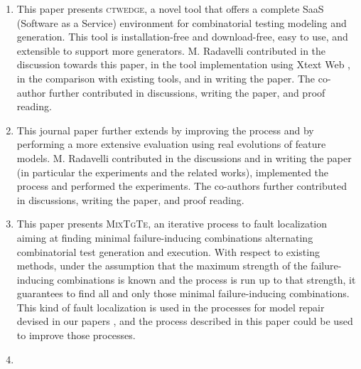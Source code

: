 \documentclass [a4paper, 12pt, twoside]{report}
\newcommand{\ctwedge}{\textsc{ctwedge}\xspace}
\newcommand{\mix}{\textsc{MixTgTe}\xspace}
\theoremstyle{plain}
\theoremstyle{definition}
\theoremstyle{remark}
\theoremstyle{plain}
\theoremstyle{plain}
\theoremstyle{remark}
\begin{document}
\begin{enumerate}
	\item \cite{IWCTGargantini2018} 
	
	This paper presents \ctwedge, a novel tool that offers a complete SaaS (Software as a Service) environment for combinatorial testing modeling and generation. This tool is installation-free and download-free, easy to use, and extensible to support more generators.
	M. Radavelli contributed in the discussion towards this paper, in the tool implementation using Xtext Web , in the comparison with existing tools, and in writing the paper.
	The co-author further contributed in discussions, writing the paper, and proof reading.

	\item \cite{arcaini2019achieving} 	
	
	This journal paper further extends \cite{arcaini_evolutionary_2018} by improving the process and by performing a more extensive evaluation using real evolutions of feature models.
	M. Radavelli contributed in the discussions and in writing the paper (in particular the experiments and the related works), implemented the process and performed the experiments.
	The co-authors further contributed in discussions, writing the paper, and proof reading.
	
	\item \cite{iwct19} 

	This paper presents \mix, an iterative process to fault localization aiming at finding minimal failure-inducing combinations alternating combinatorial test generation and execution. With respect to existing methods, under the assumption that the maximum strength of the failure-inducing combinations is known and the process is run up to that strength, it guarantees to find all and only those minimal failure-inducing combinations.
	This kind of fault localization is used in the processes for model repair devised in our papers \cite{gargantini_combinatorial_2017,IWCTGargantini2018,garn2019}, and the process described in this paper could be used to improve those processes.
	
		
	\item \cite{garn2019} 
	

\end{enumerate}
\end{document}
